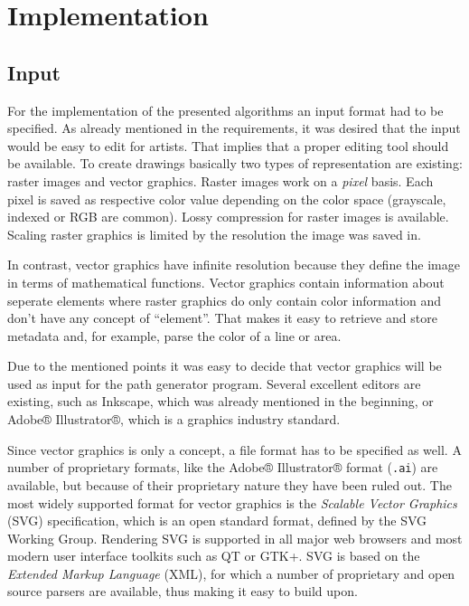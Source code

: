 \chapter{Implementation}
\section{Input}	%
For the implementation of the presented algorithms an input format had to be specified. As already mentioned in the requirements, it was desired that the input would be easy to edit for artists. That implies that a proper editing tool should be available. To create drawings basically two types of representation are existing: raster images and vector graphics. Raster images work on a \textit{pixel} basis. Each pixel is saved as respective color value depending on the color space (grayscale, indexed or RGB are common). Lossy compression for raster images is available. Scaling raster graphics is limited by the resolution the image was saved in.

In contrast, vector graphics have infinite resolution because they define the image in terms of mathematical functions. Vector graphics contain information about seperate elements where raster graphics do only contain color information and don't have any concept of \enquote{element}. That makes it easy to retrieve and store metadata and, for example, parse the color of a line or area.

Due to the mentioned points it was easy to decide that vector graphics will be used as input for the path generator program. Several excellent editors are existing, such as Inkscape, which was already mentioned in the beginning, or Adobe® Illustrator®, which is a graphics industry standard.

Since vector graphics is only a concept, a file format has to be specified as well. A number of proprietary formats, like the Adobe® Illustrator® format (\texttt{.ai}) are available, but because of their proprietary nature they have been ruled out. The most widely supported format for vector graphics is the \textit{Scalable Vector Graphics} (SVG) specification, which is an open standard format, defined by the SVG Working Group\cite{svgstandard}. Rendering SVG is supported in all major web browsers and most modern user interface toolkits such as QT or GTK+. SVG is based on the \textit{Extended Markup Language} (XML), for which a number of proprietary and open source parsers are available, thus making it easy to build upon.

